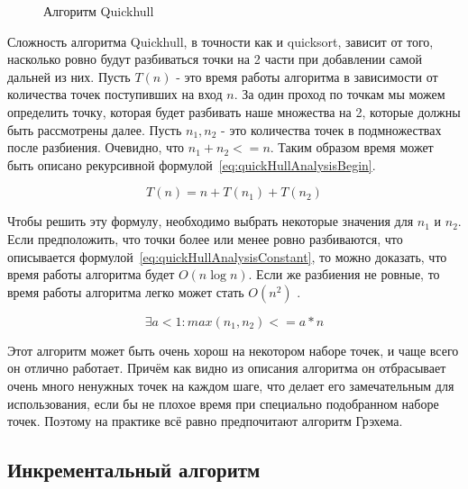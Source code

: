 \begin{figure}[H]
	{\centering
		\hfill
		\subbottom[\label{img:quickhull_second_1}]{%
			}
		\hfill
		\subbottom[\label{img:quickhull_second_2}]{%
			}
		\hfill
	}
	\caption{Алгоритм Quickhull}
	\label{img:quickhull_second}
\end{figure}

Сложность алгоритма Quickhull, в точности как и quicksort, зависит от того, насколько ровно будут разбиваться точки на 2 части при добавлении самой дальней из них. Пусть $T(n)$ - это время работы алгоритма в зависимости от количества точек поступивших на вход $n$. За один проход по точкам мы можем определить точку, которая будет разбивать наше множества на 2, которые должны быть рассмотрены далее. Пусть $n_1, n_2$ - это количества точек в подмножествах после разбиения. Очевидно, что $n_1+n_2<=n$. Таким образом время может быть описано рекурсивной формулой~\ref{eq:quickHullAnalysisBegin}.

\begin{equation}\label{eq:quickHullAnalysisBegin}
T(n) = n + T(n_1) + T(n_2)
\end{equation}

Чтобы решить эту формулу, необходимо выбрать некоторые значения для $n_1$ и $n_2$. Если предположить, что точки более или менее ровно разбиваются, что описывается формулой~\ref{eq:quickHullAnalysisConstant}, то можно доказать, что время работы алгоритма будет $O(n \log n)$. Если же разбиения не ровные, то время работы алгоритма легко может стать $O(n^2)$ \cite{mount2000lecture}.

\begin{equation}\label{eq:quickHullAnalysisConstant}
\exists  a < 1 : max(n_1, n_2) <= a * n
\end{equation}

Этот алгоритм может быть очень хорош на некотором наборе точек, и чаще всего он отлично работает. Причём как видно из описания алгоритма он отбрасывает очень много ненужных точек на каждом шаге, что делает его замечательным для использования, если бы не плохое время при специально подобранном наборе точек. Поэтому на практике всё равно предпочитают алгоритм Грэхема.

\subsection{Инкрементальный алгоритм} \label{subsect1_1_5}

